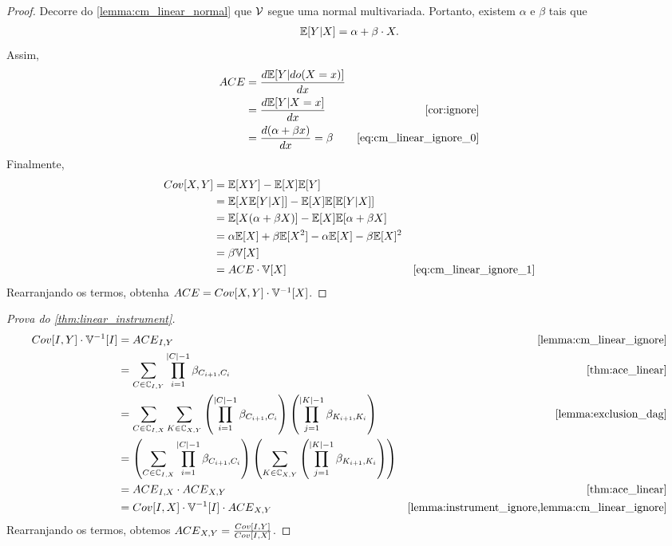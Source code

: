 \begin{proof}
 Decorre do \cref{lemma:cm_linear_normal} que
 ${\mathcal V}$ segue uma normal multivariada.
 Portanto, existem $\alpha$ e $\beta$ tais que
 \begin{align}
  \label{eq:cm_linear_ignore_0}
  {\mathbb E}[Y|X] = \alpha + \beta \cdot X.
 \end{align}
 Assim,
 \begin{align}
  \label{eq:cm_linear_ignore_1}
  \ACE &= \frac{d\E[Y|do(X=x)]}{dx} \nonumber \\
  &= \frac{d\E[Y|X=x]}{dx}
  & \text{\cref{cor:ignore}} \nonumber \\
  &= \frac{d(\alpha + \beta x)}{dx} = \beta
  & \text{\cref{eq:cm_linear_ignore_0}}
 \end{align}
 Finalmente,
 \begin{align*}
  Cov[X,Y]
  &= \E[XY] - \E[X]\E[Y] \\
  &= \E[X\E[Y|X]] - \E[X]\E[\E[Y|X]] \\
  &= \E[X(\alpha + \beta X)] - \E[X] \E[\alpha + \beta X] \\
  &= \alpha \E[X] + \beta \E[X^2] - \alpha \E[X] - \beta \E[X]^2 \\
  &= \beta \V[X] \\
  &= \ACE \cdot \V[X]
  & \text{\cref{eq:cm_linear_ignore_1}}
 \end{align*}
 Rearranjando os termos, obtenha 
 ${ACE} = Cov[X,Y] \cdot {\mathbb V}^{-1}[X]$.
\end{proof}

\begin{proof}[Prova do \cref{thm:linear_instrument}]
 \begin{align*}
  Cov[I,Y] \cdot \V^{-1}[I]
  &= \ACE_{I,Y}
  & \text{\cref{lemma:cm_linear_ignore}} \\
  &= \sum_{C \in \mathbb{C}_{I,Y}} \prod_{i=1}^{|C|-1} \beta_{C_{i+1},C_i}
  & \text{\cref{thm:ace_linear}} \\
  &= \sum_{C \in \mathbb{C}_{I,X}} \sum_{K \in \mathbb{C}_{X,Y}}
  \left(\prod_{i=1}^{|C|-1} \beta_{C_{i+1},C_i}\right)
  \left(\prod_{j=1}^{|K|-1} \beta_{K_{i+1},K_i}\right) 
  & \text{\cref{lemma:exclusion_dag}} \\
  &= \left(\sum_{C \in \mathbb{C}_{I,X}} \prod_{i=1}^{|C|-1} \beta_{C_{i+1},C_i}\right)
  \left(\sum_{K \in \mathbb{C}_{X,Y}} \left(\prod_{j=1}^{|K|-1} \beta_{K_{i+1},K_i}\right)\right) \\
  &= \ACE_{I,X} \cdot \ACE_{X,Y}
  & \text{\cref{thm:ace_linear}} \\
  &= Cov[I,X] \cdot \V^{-1}[I] \cdot \ACE_{X,Y}
  & \text{\cref{lemma:instrument_ignore,lemma:cm_linear_ignore}}
 \end{align*}
 Rearranjando os termos, obtemos ${ACE}_{X,Y} = \frac{Cov[I,Y]}{Cov[I,X]}$.
\end{proof}

